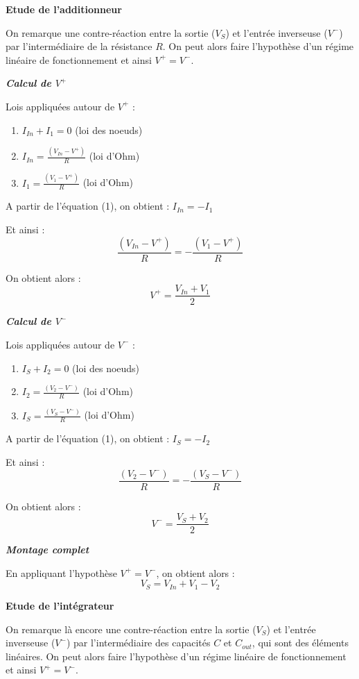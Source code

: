 \documentclass[a4paper,french]{paper}
\begin{document}
\textbf{Etude de l'additionneur}

On remarque une contre-réaction entre la sortie ($V_S$) et l'entrée inverseuse ($V^-$) par l'intermédiaire de la résistance $R$. On peut alors faire l'hypothèse d'un régime linéaire de fonctionnement et ainsi $V^+ = V^-$.

\medskip

\textbf{\textit{Calcul de $V^+$}}

Lois appliquées autour de $V^+$ :
\begin{enumerate}
	\item $I_{In} + I_1 = 0$ (loi des noeuds)
	\item $I_{In} = \frac{(V_{In} - V^+)}{R}$ (loi d'Ohm)
	\item $I_{1} = \frac{(V_{1} - V^+)}{R}$ (loi d'Ohm)
\end{enumerate}

A partir de l'équation (1), on obtient : $I_{In} = - I_1$

Et ainsi :
$$\frac{(V_{In} - V^+)}{R} = - \frac{(V_{1} - V^+)}{R}$$

On obtient alors : $$\boxed{V^+ = \frac{V_{In} + V_1}{2}}$$

\textbf{\textit{Calcul de $V^-$}}

Lois appliquées autour de $V^-$ :
\begin{enumerate}
	\item $I_{S} + I_2 = 0$ (loi des noeuds)
	\item $I_{2} = \frac{(V_{2} - V^-)}{R}$ (loi d'Ohm)
	\item $I_{S} = \frac{(V_{S} - V^-)}{R}$ (loi d'Ohm)
\end{enumerate}

A partir de l'équation (1), on obtient : $I_{S} = - I_2$

Et ainsi :
$$\frac{(V_{2} - V^-)}{R} = - \frac{(V_{S} - V^-)}{R}$$

On obtient alors : $$\boxed{V^- = \frac{V_{S} + V_2}{2}}$$

\textbf{\textit{Montage complet}}

En appliquant l'hypothèse $V^+ = V^-$, on obtient alors : $$\boxed{V_S = V_{In} + V_1 - V_2}$$

\newpage

\textbf{Etude de l'intégrateur}

On remarque là encore une contre-réaction entre la sortie ($V_S$) et l'entrée inverseuse ($V^-$) par l'intermédiaire des capacités $C$ et $C_{out}$, qui sont des éléments linéaires. On peut alors faire l'hypothèse d'un régime linéaire de fonctionnement et ainsi $V^+ = V^-$.
\end{document}
